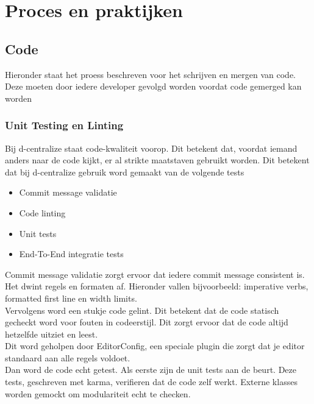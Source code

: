 \chapter{Proces en praktijken}

\section{Code}

Hieronder staat het proess beschreven voor het schrijven en mergen van code. Deze moeten door iedere developer gevolgd worden voordat code gemerged kan worden

\subsection{Unit Testing en Linting}

Bij d-centralize staat code-kwaliteit voorop. Dit betekent dat, voordat iemand anders naar de code kijkt, er al strikte maatstaven gebruikt worden. Dit betekent dat bij d-centralize gebruik word gemaakt van de volgende tests

\begin{itemize}
	\item Commit message validatie
	\item Code linting
	\item Unit tests
	\item End-To-End integratie tests
\end{itemize}

Commit message validatie zorgt ervoor dat iedere commit message consistent is. Het dwint regels en formaten af. Hieronder vallen bijvoorbeeld: imperative verbs, formatted first line en width limits. \\

Vervolgens word een stukje code gelint. Dit betekent dat de code statisch gecheckt word voor fouten in codeerstijl. Dit zorgt ervoor dat de code altijd hetzelfde uitziet en leest. \\

Dit word geholpen door EditorConfig, een speciale plugin die zorgt dat je editor standaard aan alle regels voldoet. \\

Dan word de code echt getest. Als eerste zijn de unit tests aan de beurt. Deze tests, geschreven met karma, verifieren dat de code zelf werkt. Externe klasses worden gemockt om modulariteit echt te checken. \\

